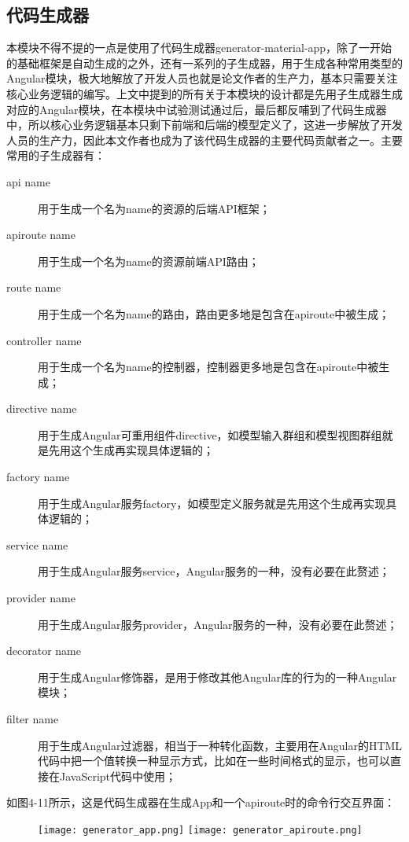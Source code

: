 \subsection{代码生成器}
本模块不得不提的一点是使用了代码生成器generator-material-app，除了一开始的基础框架是自动生成的之外，还有一系列的子生成器，用于生成各种常用类型的Angular模块，极大地解放了开发人员也就是论文作者的生产力，基本只需要关注核心业务逻辑的编写。上文中提到的所有关于本模块的设计都是先用子生成器生成对应的Angular模块，在本模块中试验测试通过后，最后都反哺到了代码生成器中，所以核心业务逻辑基本只剩下前端和后端的模型定义了，这进一步解放了开发人员的生产力，因此本文作者也成为了该代码生成器的主要代码贡献者之一。主要常用的子生成器有：
\begin{description}
  \item[api name] 用于生成一个名为name的资源的后端API框架；
  \item[apiroute name] 用于生成一个名为name的资源前端API路由；
  \item[route name] 用于生成一个名为name的路由，路由更多地是包含在apiroute中被生成；
  \item[controller name] 用于生成一个名为name的控制器，控制器更多地是包含在apiroute中被生成；
  \item[directive name] 用于生成Angular可重用组件directive，如模型输入群组和模型视图群组就是先用这个生成再实现具体逻辑的；
  \item[factory name] 用于生成Angular服务factory，如模型定义服务就是先用这个生成再实现具体逻辑的；
  \item[service name] 用于生成Angular服务service，Angular服务的一种，没有必要在此赘述；
  \item[provider name] 用于生成Angular服务provider，Angular服务的一种，没有必要在此赘述；
  \item[decorator name] 用于生成Angular修饰器，是用于修改其他Angular库的行为的一种Angular模块；
  \item[filter name] 用于生成Angular过滤器，相当于一种转化函数，主要用在Angular的HTML代码中把一个值转换一种显示方式，比如在一些时间格式的显示，也可以直接在JavaScript代码中使用；
\end{description}
如图4-11所示，这是代码生成器在生成App和一个apiroute时的命令行交互界面：

\begin{figure}[!htp]
 \centering
 \texttt{[image: generator\_app.png]}
 \texttt{[image: generator\_apiroute.png]}
\end{figure}

